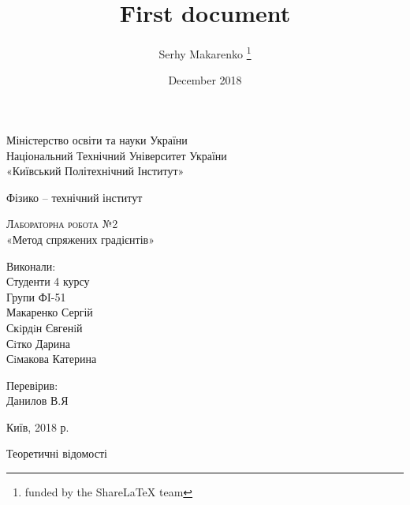 \documentclass[12pt, letterpaper, twoside]{article}
\title{First document}
\author{Serhy Makarenko \thanks{funded by the ShareLaTeX team}}
\date{December 2018}
\begin{document}
	
\begin{titlepage}
	\begin{center}
		\large



		\vspace{0.5cm}
				Міністерство освіти та науки України\\
		Національний Технічний Університет України\\
		«Київський Політехнічний Інститут»
\\
	
		\vspace{0.25cm}
		
	Фізико – технічний інститут


		\vfill
		
		\textsc{Лабораторна робота №2}\\[5mm]
		
		{\LARGE «Метод спряжених градієнтів»}
		\bigskip
		
	\end{center}
	\vfill
	
	\newlength{\ML}
	\hfill\begin{minipage}{0.3\textwidth}
		Виконали:\\
		 Студенти 4 курсу\\
		 Групи ФI-51\\
		 Макаренко Сергій\\
		 Скiрдiн Євгенiй\\
		 Сiтко Дарина\\
		 Сiмакова Катерина\\
	
	\end{minipage}%
	\bigskip
	
	\hfill\begin{minipage}{0.3\textwidth}
		Перевірив:\\
		Данилов В.Я
	\end{minipage}%
	\vfill
	
	\begin{center}
		Київ, 2018 р.
	\end{center}
\end{titlepage}
	


\begin{center}
	Теоретичні відомості
\end{center}
\end{document}
